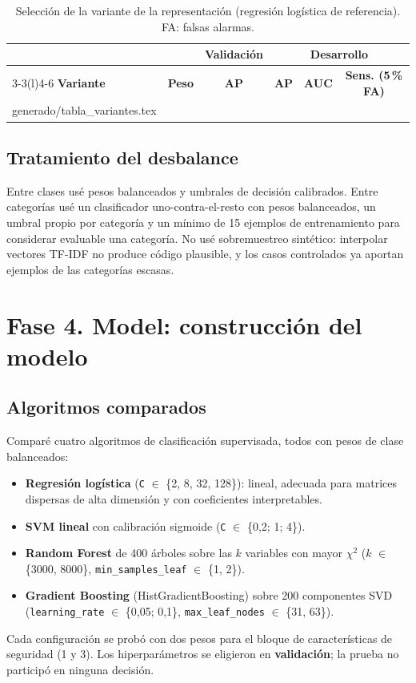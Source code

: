 \documentclass[12pt,a4paper]{article}
\makeatletter
\newcommand{\cod}[1]{\texttt{#1}}
\newcommand{\tabla}[1]{\@@input generado/#1 }
\makeatother
\begin{document}
\begin{table}[H]
\centering\footnotesize
\caption{Selección de la variante de la representación (regresión logística de referencia). FA: falsas alarmas.}
\label{tab:variantes}
\begin{tabular}{@{}lccccc@{}}
\toprule
 & & \textbf{Validación} & \multicolumn{3}{c}{\textbf{Desarrollo}}\\
\cmidrule(lr){3-3}\cmidrule(l){4-6}
\textbf{Variante} & \textbf{Peso} & \textbf{AP} & \textbf{AP} & \textbf{AUC} & \textbf{Sens. (5\,\% FA)}\\
\midrule
\tabla{tabla_variantes.tex}
\bottomrule
\end{tabular}
\end{table}

\subsection{Tratamiento del desbalance}
Entre clases usé pesos balanceados y umbrales de decisión calibrados. Entre categorías usé un clasificador uno-contra-el-resto con pesos balanceados, un umbral propio por categoría y un mínimo de 15 ejemplos de entrenamiento para considerar evaluable una categoría. No usé sobremuestreo sintético: interpolar vectores TF-IDF no produce código plausible, y los casos controlados ya aportan ejemplos de las categorías escasas.

\section{Fase 4. Model: construcción del modelo}
\subsection{Algoritmos comparados}
Comparé cuatro algoritmos de clasificación supervisada, todos con pesos de clase balanceados:

\begin{itemize}
  \item \textbf{Regresión logística} (\cod{C} \(\in\) \{2, 8, 32, 128\}): lineal, adecuada para matrices dispersas de alta dimensión y con coeficientes interpretables.
  \item \textbf{SVM lineal} con calibración sigmoide (\cod{C} \(\in\) \{0,2; 1; 4\}).
  \item \textbf{Random Forest} de 400 árboles sobre las \(k\) variables con mayor \(\chi^2\) (\(k\) \(\in\) \{3000, 8000\}, \cod{min\_samples\_leaf} \(\in\) \{1, 2\}).
  \item \textbf{Gradient Boosting} (HistGradientBoosting) sobre 200 componentes SVD (\cod{learning\_rate} \(\in\) \{0,05; 0,1\}, \cod{max\_leaf\_nodes} \(\in\) \{31, 63\}).
\end{itemize}
Cada configuración se probó con dos pesos para el bloque de características de seguridad (1 y 3). Los hiperparámetros se eligieron en \textbf{validación}; la prueba no participó en ninguna decisión.
\end{document}
